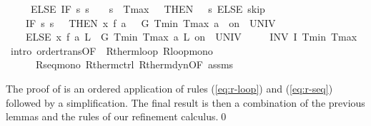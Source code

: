 \documentclass[envcountsame]{llncs}
\begin{document}
\begin{example}
\begin{isabellebody}
\ \ \ \ \ ELSE\ IF\ {\isacharparenleft}{\isasymlambda}s{\isachardot}\ s{\isachardollar}{}\ {\isacharequal}\ {}\ {\isasymand}\ s{\isachardollar}{}\ {\isasymge}\ Tmax\ {\isacharminus}\ {}{\isacharparenright}\ THEN\ {\isacharparenleft}{}\ {\isacharcolon}{\isacharcolon}{\isacharequal}\ {\isacharparenleft}{\isasymlambda}s{\isachardot}{}{\isacharparenright}{\isacharparenright}\ ELSE\ skip{\isacharparenright}{\isacharsemicolon}\isanewline
\ \ \ \ %
\isanewline
\ \ \ \ {\isacharparenleft}IF\ {\isacharparenleft}{\isasymlambda}s{\isachardot}\ s{\isachardollar}{}\ {\isacharequal}\ {}{\isacharparenright}\ THEN\ {\isacharparenleft}x{\isasymacute}{\isacharequal}\ f\ a\ {}\ {\isacharampersand}\ G\ Tmin\ Tmax\ a\ {}\ on\ {\isacharbraceleft}{}{\isachardot}{\isachardot}{\isasymtau}{\isacharbraceright}\ UNIV\ {\isacharat}\ {}{\isacharparenright}\ \isanewline
\ \ \ \ ELSE\ {\isacharparenleft}x{\isasymacute}{\isacharequal}\ f\ a\ L\ {\isacharampersand}\ G\ Tmin\ Tmax\ a\ L\ on\ {\isacharbraceleft}{}{\isachardot}{\isachardot}{\isasymtau}{\isacharbraceright}\ UNIV\ {\isacharat}\ {}{\isacharparenright}{\isacharparenright}\isanewline
\ \ {\isacharparenright}\ INV\ I\ Tmin\ Tmax{\isacharparenright}{\isachardoublequoteclose}\isanewline
\ \isamarkupfalse%
\ {\isacharparenleft}intro\ order{\isacharunderscore}trans{\isacharbrackleft}OF\ {\isacharunderscore}\ R{\isacharunderscore}therm{\isacharunderscore}loop{\isacharbrackright}\ R{\isacharunderscore}loop{\isacharunderscore}mono\ \isanewline
\ \ \ \ \ \ R{\isacharunderscore}seq{\isacharunderscore}mono\ R{\isacharunderscore}therm{\isacharunderscore}ctrl\ R{\isacharunderscore}therm{\isacharunderscore}dyn{\isacharbrackleft}OF\ assms{\isacharbrackright}{\isacharparenright}\isanewline
\end{isabellebody}

The proof of  is an ordered application of rules (\ref{eq:r-loop}) and (\ref{eq:r-seq}) followed by a simplification. The final result  is then a combination of the previous lemmas and the rules of our refinement calculus.\qed

\end{example}
\end{document}
